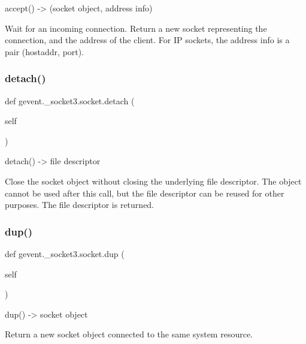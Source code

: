 \begin{DoxyVerb}accept() -> (socket object, address info)

Wait for an incoming connection.  Return a new socket
representing the connection, and the address of the client.
For IP sockets, the address info is a pair (hostaddr, port).
\end{DoxyVerb}
 \mbox{\label{classgevent_1_1__socket3_1_1socket_a728f323e3a7940a04ce429fa110e889b}} 
\subsubsection{\texorpdfstring{detach()}{detach()}}
{\footnotesize\ttfamily def gevent.\+\_\+socket3.\+socket.\+detach (\begin{DoxyParamCaption}\item[{}]{self }\end{DoxyParamCaption})}

\begin{DoxyVerb}detach() -> file descriptor

Close the socket object without closing the underlying file descriptor.
The object cannot be used after this call, but the file descriptor
can be reused for other purposes.  The file descriptor is returned.
\end{DoxyVerb}
 \mbox{\label{classgevent_1_1__socket3_1_1socket_a1df6586b8907e0a991c9fd041de0d233}} 
\subsubsection{\texorpdfstring{dup()}{dup()}}
{\footnotesize\ttfamily def gevent.\+\_\+socket3.\+socket.\+dup (\begin{DoxyParamCaption}\item[{}]{self }\end{DoxyParamCaption})}

\begin{DoxyVerb}dup() -> socket object

Return a new socket object connected to the same system resource.
\end{DoxyVerb}
 \mbox{\label{classgevent_1_1__socket3_1_1socket_a6ef84a09239b22b55ffd02a5c520aa75}} 
